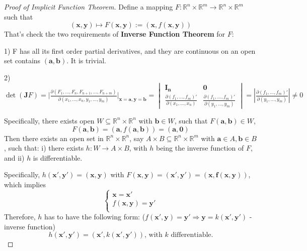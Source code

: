 \begin{proof}[Proof of Implicit Function Theorem]
    Define a mapping $F: \mathbb{R}^{n} \times \mathbb{R}^{m} \to \mathbb{R}^{n} \times \mathbb{R}^{m}$ such that \[
        (\mathbf{x}, \mathbf{y}) \mapsto F(\mathbf{x}, \mathbf{y}) := (\mathbf{x}, f(\mathbf{x,y}))
    \]
    That's check the two requirements of \textbf{Inverse Function Theorem} for $F$:

    1) F has all its first order partial derivatives, and they are continuous on an open set contains $(\mathbf{a, b})$. It is trivial.

    2)$\det (\mathbf{J}F) = \big|\frac{\partial (F_1,\dots,F_n,F_{n+1},\dots,F_{n+m})}{\partial (x_1,\dots,x_n,y_1,\dots,y_m)}\big|_{\mathbf{x=a,y=b}} = \begin{vmatrix}
            \boldsymbol{I_n}                                           & \boldsymbol{0}                                             \\
            \frac{\partial (f_1,\dots,f_m)'}{\partial (x_1,\dots,x_n)} & \frac{\partial (f_1,\dots,f_m)'}{\partial (y_1,\dots,y_m)}
        \end{vmatrix} = \left|\frac{\partial (f_1,\dots,f_m)'}{\partial (y_1,\dots,y_m)}\right| \neq 0$

    Specifically, there exists open $W \subseteq \mathbb{R}^{n} \times \mathbb{R}^{n}$ with $\mathbf{b} \in W$, such that $F(\mathbf{a,b}) \in W$,
    \[
        F(\mathbf{a}, \mathbf{b}) = (\mathbf{a}, f(\mathbf{a,b})) = (\mathbf{a, 0})
    \]
    Then there exists an open set in $\mathbb{R}^{n} \times \mathbb{R}^{n}$, say $A \times B \subseteq \mathbb{R}^{n} \times \mathbb{R}^{m}$ with $\mathbf{a} \in A, \mathbf{b} \in B$, such that:
    i) there exists $h: W \to A \times B$, with $h$ being the inverse function of $F$, and
    ii) $h$ is differentiable.

    Specifically, $h(\mathbf{x',y'}) = (\mathbf{x,y})$ with $F(\mathbf{x,y}) = (\mathbf{x',y'}) = (\mathbf{x, f(\mathbf{x,y})})$, which implies \[
        \left\{\begin{array}{l}
            \mathbf{x} = \mathbf{x'}      \\
            f(\mathbf{x,y}) = \mathbf{y'} \\
        \end{array}\right.
    \]
    Therefore, $h$ has to have the following form: ($f(\mathbf{x',y}) = \mathbf{y'} \Rightarrow  \mathbf{y} = k(\mathbf{x',y'})$ - inverse function) \[
        h(\mathbf{x',y'}) = (\mathbf{x'},k(\mathbf{x',y'})), \, \text{with $k$ differentiable}.
    \]


\end{proof}
